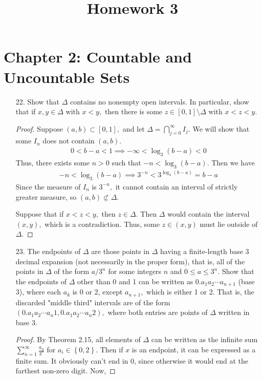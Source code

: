 \documentclass{article}
\begin{document}
\title{Homework 3}
\maketitle
\thispagestyle{fancy}

\section*{Chapter 2: Countable and Uncountable Sets}

\begin{itemize}
	\item[22.] Show that $\Delta$ contains no nonempty open intervals. In particular, show that if $x, y\in \Delta$ with $x<y,$ then there is some $z\in[0, 1]\setminus \Delta$ with $x<z<y.$
		\begin{proof}
			Suppose $(a, b)\subset [0, 1],$ and let $\Delta=\bigcap_{j=0}^\infty I_j.$ We will show that some $I_n$ does not contain $(a, b).$
			\begin{align*}
				0 < b-a <1 \implies -\infty<\log_3(b-a)<0
			\end{align*}
			Thus, there exists some $n>0$ such that $-n<\log_3(b-a).$ Then we have
			\begin{align*}
				-n<\log_3(b-a)\implies 3^{-n}<3^{\log_3(b-a)} = b-a
			\end{align*}
			Since the measure of $I_n$ is $3^{-n},$ it cannot contain an interval of strictly greater measure, so $(a, b)\not\subset \Delta.$

			Suppose that if $x<z<y,$ then $z\in \Delta.$ Then $\Delta$ would contain the interval $(x, y),$ which is a contradiction. Thus, some $z\in(x, y)$ must lie outside of $\Delta.$
		\end{proof}

	\item[23.] The endpoints of $\Delta$ are those points in $\Delta$ having a finite-length base 3 decimal expansion (not necessarily in the proper form), that is, all of the points in $\Delta$ of the form $a/3^n$ for some integers $n$ and $0\le a\le 3^n.$ Show that the endpoints of $\Delta$ other than 0 and 1 can be written as $0.a_1a_2\cdots a_{n+1}$ (base 3), where each $a_k$ is 0 or 2, except $a_{n+1},$ which is either 1 or 2. That is, the discarded "middle third" intervals are of the form $(0.a_1a_2\cdots a_n1, 0.a_1a_2\cdots a_n2),$ where both entries are points of $\Delta$ written in base 3.
		\begin{proof}
			By Theorem 2.15, all elements of $\Delta$ can be written as the infinite sum $\sum_{n=1}^{\infty} \frac{a_n}{3^n}$ for $a_i\in\left\{ 0, 2 \right\}.$ Then if $x$ is an endpoint, it can be expressed as a finite sum. It obviously can't end in 0, since otherwise it would end at the farthest non-zero digit. Now,
			

\end{proof}
\end{itemize}
\end{document}

